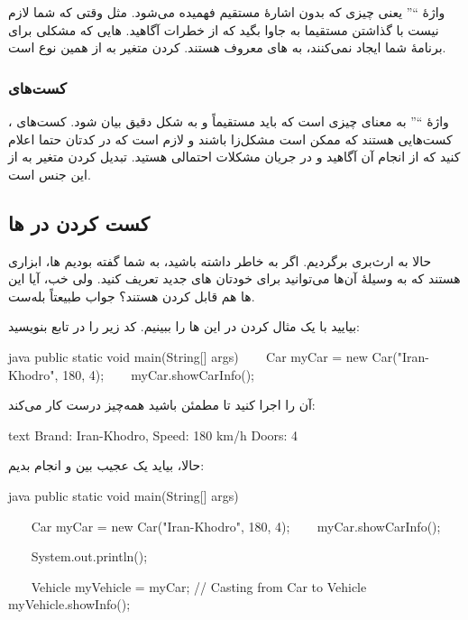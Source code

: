 واژهٔ ``'' یعنی چیزی که بدون اشارهٔ مستقیم فهمیده می‌شود. مثل
وقتی که شما لازم نیست با گذاشتن  مستقیما به جاوا بگید
که از خطرات  آگاهید.  هایی که مشکلی برای برنامهٔ شما
ایجاد نمی‌کنند، به  های  معروف هستند. 
کردن متغیر  به  از همین نوع است.

\subsubsection{کست‌های }

واژهٔ ``'' به معنای چیزی است که باید مستقیماً و به شکل دقیق
بیان شود. کست‌های  ، کست‌هایی هستند که ممکن است مشکل‌زا باشند
و لازم است که در کدتان حتما اعلام کنید که از انجام آن  آگاهید و
در جریان مشکلات احتمالی هستید. تبدیل کردن متغیر  به
 از این جنس است.

\subsection{کست کردن در  ها}

حالا به ارث‌بری برگردیم. اگر به خاطر داشته باشید، به شما گفته بودیم
 ها، ابزاری هستند که به وسیلهٔ آن‌ها می‌توانید برای خودتان
 های جدید تعریف کنید. ولی خب، آیا این  ها هم قابل
 کردن هستند؟ جواب طبیعتاً بله‌ست.

بیایید با یک مثال  کردن در این  ها را ببینیم. کد زیر
را در تابع  بنویسید:

\begin{codebox}{java}
public static void main(String[] args) {  
    Car myCar = new Car("Iran-Khodro", 180, 4);  
    myCar.showCarInfo();  
}
\end{codebox}

آن را اجرا کنید تا مطمئن باشید همه‌چیز درست کار می‌کند:

\begin{codebox}{text}
Brand: Iran-Khodro, Speed: 180 km/h  
Doors: 4
\end{codebox}

حالا، بیاید یک  عجیب بین  و
 انجام بدیم:

\begin{codebox}{java}
public static void main(String[] args) {  
    Car myCar = new Car("Iran-Khodro", 180, 4);  
    myCar.showCarInfo();  
  
    System.out.println();  
  
    Vehicle myVehicle = myCar; // Casting from Car to Vehicle
    myVehicle.showInfo();  
}
\end{codebox}


